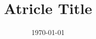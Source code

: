 \documentclass[preprint]{elsarticle}
\begin{document}

\title{Atricle Title}

\date{\today}

\begin{abstract}

\end{abstract}


\begin{keyword}
    
\end{keyword}
\maketitle




\end{document}
